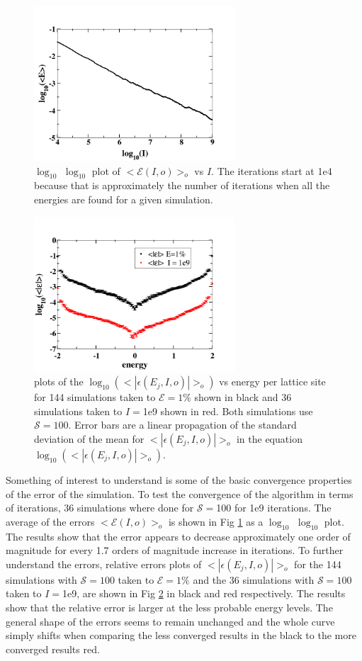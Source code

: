 \documentclass[aps,prl,reprint,superscriptaddress,showkeys]{revtex4-1}
\begin{document}
\begin{figure}
\includegraphics[width=7.5cm]{Fig2.png}
\caption{\label{log_t_err}$\log_{10}$ $\log_{10}$ plot of $<\mathcal{E}(I,o)>_o$ vs $I$.  The iterations start at 1e4 because that is approximately the number of iterations when all the energies are found for a given simulation. }
\end{figure}
\begin{figure}
\includegraphics[width=7.5cm]{Fig3.png}
\caption{\label{rel_errors}plots of the $\log_{10}(<|\epsilon(E_j,I,o)|>_o )$ vs  energy per lattice site for 144 simulations taken to $\mathcal{E}=1\%$ shown in black and  36 simulations taken to $I=$1e9 shown in red. Both simulations use $\mathcal{S}=100$. Error bars are a linear propagation of the standard deviation of the mean for $<|\epsilon(E_j,I,o)|>_o$ in the equation $\log_{10}(<|\epsilon(E_j,I,o)|>_o )$. }
\end{figure}
Something of interest to understand is some of the basic convergence properties of the error of the simulation. To test the convergence of the algorithm in terms of iterations,  36 simulations where done for  $\mathcal{S}=$100 for 1e9 iterations. The average of the errors $<\mathcal{E}(I,o)>_o$ is shown in Fig \ref{log_t_err}  as a $\log_{10}$ $\log_{10}$  plot. The results show that the error appears to decrease approximately one order of magnitude for every 1.7 orders of magnitude increase in iterations.  To further understand the errors, relative errors plots of $<|\epsilon(E_j,I,o)|>_o$ for the 144 simulations with $\mathcal{S}=100$ taken to $\mathcal{E}=1\%$ and the 36 simulations with $\mathcal{S}=100$ taken to $I=$1e9,  are shown in Fig \ref{rel_errors} in black and red respectively. The results show that the relative error is larger at the less probable energy levels. The general shape of the errors seems to remain unchanged and the whole curve simply shifts when comparing the less converged results in the black to the more converged results red. 
\end{document}
